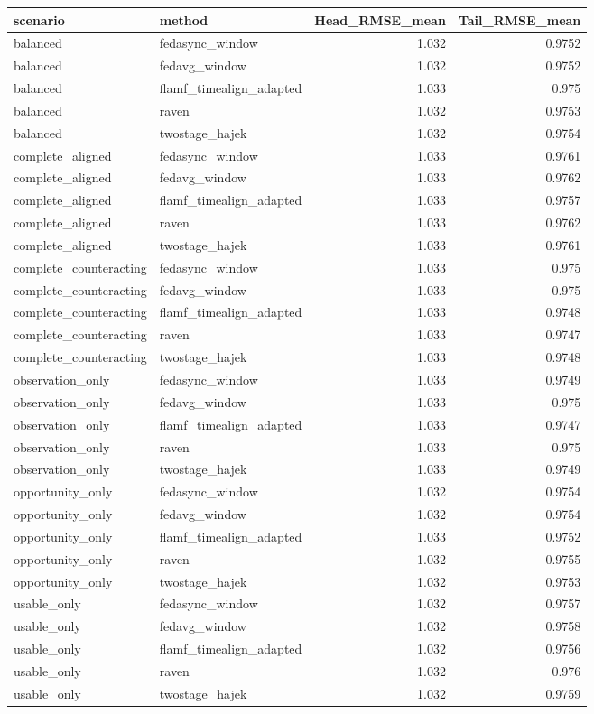 \begin{tabular}{llrr}
\toprule
scenario & method & Head_RMSE_mean & Tail_RMSE_mean \\
\midrule
balanced & fedasync_window & 1.032 & 0.9752 \\
balanced & fedavg_window & 1.032 & 0.9752 \\
balanced & flamf_timealign_adapted & 1.033 & 0.975 \\
balanced & raven & 1.032 & 0.9753 \\
balanced & twostage_hajek & 1.032 & 0.9754 \\
complete_aligned & fedasync_window & 1.033 & 0.9761 \\
complete_aligned & fedavg_window & 1.033 & 0.9762 \\
complete_aligned & flamf_timealign_adapted & 1.033 & 0.9757 \\
complete_aligned & raven & 1.033 & 0.9762 \\
complete_aligned & twostage_hajek & 1.033 & 0.9761 \\
complete_counteracting & fedasync_window & 1.033 & 0.975 \\
complete_counteracting & fedavg_window & 1.033 & 0.975 \\
complete_counteracting & flamf_timealign_adapted & 1.033 & 0.9748 \\
complete_counteracting & raven & 1.033 & 0.9747 \\
complete_counteracting & twostage_hajek & 1.033 & 0.9748 \\
observation_only & fedasync_window & 1.033 & 0.9749 \\
observation_only & fedavg_window & 1.033 & 0.975 \\
observation_only & flamf_timealign_adapted & 1.033 & 0.9747 \\
observation_only & raven & 1.033 & 0.975 \\
observation_only & twostage_hajek & 1.033 & 0.9749 \\
opportunity_only & fedasync_window & 1.032 & 0.9754 \\
opportunity_only & fedavg_window & 1.032 & 0.9754 \\
opportunity_only & flamf_timealign_adapted & 1.033 & 0.9752 \\
opportunity_only & raven & 1.032 & 0.9755 \\
opportunity_only & twostage_hajek & 1.032 & 0.9753 \\
usable_only & fedasync_window & 1.032 & 0.9757 \\
usable_only & fedavg_window & 1.032 & 0.9758 \\
usable_only & flamf_timealign_adapted & 1.032 & 0.9756 \\
usable_only & raven & 1.032 & 0.976 \\
usable_only & twostage_hajek & 1.032 & 0.9759 \\
\bottomrule
\end{tabular}

